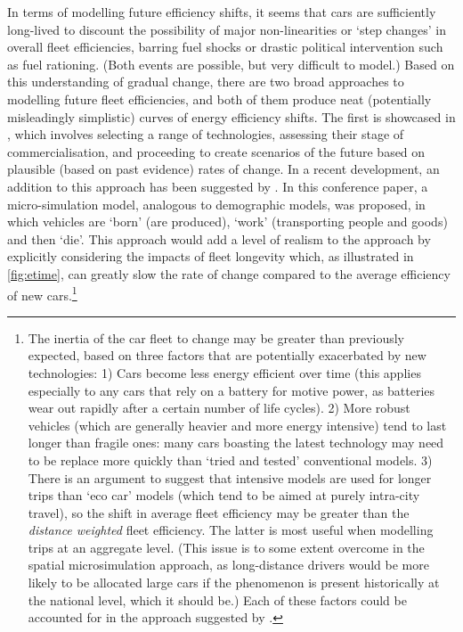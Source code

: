 \documentclass[a4paper, 11pt, twoside]{Thesis}
\begin{document}
In terms of modelling future efficiency shifts, it seems that cars are sufficiently
long-lived to discount the possibility of major non-linearities or
`step changes' in overall fleet efficiencies, barring fuel shocks
\citep{Lyons2002} or drastic political intervention such as fuel rationing.
(Both events are possible, but very difficult to model.)
Based on this understanding of gradual change, there
are two broad approaches to modelling future fleet efficiencies, and both
of them produce neat (potentially misleadingly simplistic) curves of energy efficiency
shifts. The first is showcased in \citet{Baptista2012}, which involves selecting
a range of technologies, assessing their stage of commercialisation, and
proceeding to create scenarios of the future based on plausible (based on
past evidence) rates of change. In a recent development, an addition to this
approach has been suggested by \citet{Zuo2013}. In this conference paper,
a micro-simulation model, analogous to demographic models, was proposed,
in which vehicles are `born' (are produced), `work' (transporting people
and goods) and then `die'. This approach would add a level of realism to
the approach by explicitly considering the impacts of fleet longevity which,
as illustrated in \cref{fig:etime}, can greatly slow the rate of change compared
to the average efficiency of new
cars.\footnote{The inertia
of the car fleet to change may be greater than previously expected,
based on three factors that are potentially exacerbated by new technologies:
1) Cars become less energy efficient over time (this applies especially to
any cars that rely on a battery for motive power, as batteries
wear out rapidly after a certain number of life cycles). 2) More robust
vehicles (which are generally heavier and more energy intensive)
tend to last longer than fragile ones: many cars boasting the latest
technology may need to be replace more quickly than `tried and tested'
conventional models. 3) There is an argument to suggest that intensive models
are used for longer trips than `eco car' models (which tend to be aimed at
purely intra-city travel), so the shift in average fleet efficiency
may be greater than the \emph{distance weighted} fleet efficiency. The latter
is most useful when modelling trips at an aggregate level.
(This issue is to some extent overcome in the spatial microsimulation
approach, as long-distance drivers would be more likely to be
allocated large cars if the phenomenon is present historically at the national
level, which it should be.) Each of these factors could be accounted for in
the approach suggested by \citet{Zuo2013}.
}
\end{document}
